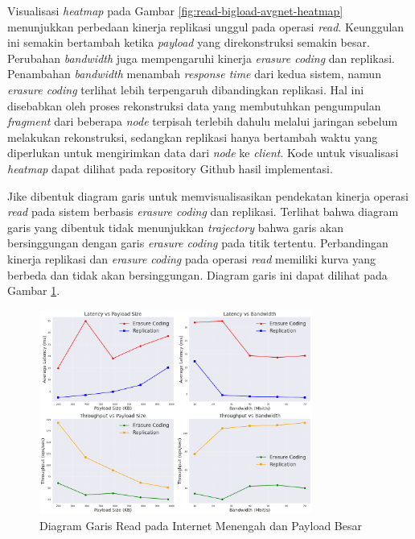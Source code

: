 \begin{enumerate}
	      Visualisasi \textit{heatmap} pada Gambar \ref{fig:read-bigload-avgnet-heatmap} menunjukkan perbedaan kinerja replikasi unggul pada operasi \textit{read}. Keunggulan ini semakin bertambah ketika \textit{payload} yang direkonstruksi semakin besar. Perubahan \textit{bandwidth} juga mempengaruhi kinerja \textit{erasure coding} dan replikasi. Penambahan \textit{bandwidth} menambah \textit{response time} dari kedua sistem, namun \textit{erasure coding} terlihat lebih terpengaruh dibandingkan replikasi. Hal ini disebabkan oleh proses rekonstruksi data yang membutuhkan pengumpulan \textit{fragment} dari beberapa \textit{node} terpisah terlebih dahulu melalui jaringan sebelum melakukan rekonstruksi, sedangkan replikasi hanya bertambah waktu yang diperlukan untuk mengirimkan data dari \textit{node} ke \textit{client}. Kode untuk visualisasi \textit{heatmap} dapat dilihat pada repository Github hasil implementasi.

	      Jike dibentuk diagram garis untuk memvisualisasikan pendekatan kinerja operasi \textit{read} pada sistem berbasis \textit{erasure coding} dan replikasi. Terlihat bahwa diagram garis yang dibentuk tidak menunjukkan \textit{trajectory} bahwa garis akan bersinggungan dengan garis \textit{erasure coding} pada titik tertentu. Perbandingan kinerja replikasi dan \textit{erasure coding} pada operasi \textit{read} memiliki kurva yang berbeda dan tidak akan bersinggungan. Diagram garis ini dapat dilihat pada Gambar \ref{fig:read-bigload-avgnet-line}.

	      \begin{figure}[ht]
		      \centering
		      \includegraphics[width=0.8\textwidth]{resources/chapter-4/read_bigload_avgnet_line.png}

		      \caption{Diagram Garis Read pada Internet Menengah dan Payload Besar}
		      \label{fig:read-bigload-avgnet-line}
	      \end{figure}


\end{enumerate}
